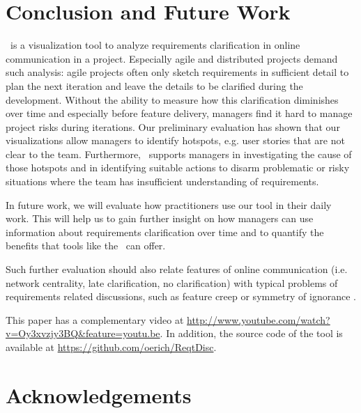 \section{Conclusion and Future Work}
 \viss\ is a visualization tool to analyze requirements clarification in online communication in a project.
Especially agile and distributed projects demand such analysis: agile projects often only sketch requirements in sufficient detail to plan the next iteration and leave the details to be clarified during the development.
Without the ability to measure how this clarification diminishes over time and especially before feature delivery, managers find it hard to manage project risks during iterations.
Our preliminary evaluation has shown that our visualizations allow managers to identify hotspots, e.g. user stories that are not clear to the team. 
Furthermore, \viss\ supports managers in investigating the cause of those hotspots and in identifying suitable actions to disarm problematic or risky situations where the team has insufficient understanding of requirements.
 
In future work, we will evaluate how practitioners use our tool in their daily work. 
This will help us to gain further insight on how managers can use information about requirements clarification over time and to quantify the benefits that tools like the \viss\ can offer.

Such further evaluation should also relate features of online communication (i.e. network centrality, late clarification, no clarification) with typical problems of requirements related discussions, such as feature creep \cite{Jones1996} or symmetry of ignorance \cite{Fischer2000}.

This paper has a complementary video at \url{http://www.youtube.com/watch?v=Oy3xvzjy3BQ&feature=youtu.be}. In addition, the source code of the tool is available at \url{https://github.com/oerich/ReqtDisc}.
\section*{Acknowledgements}
